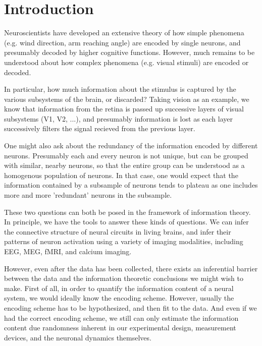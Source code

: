 \documentclass[12pt]{article}
\begin{document}
\maketitle

\newcommand{\tr}{\text{tr}}
\newcommand{\E}{\textbf{E}}
\newcommand{\diag}{\text{diag}}
\newcommand{\argmax}{\text{argmax}}
\newcommand{\Cov}{\text{Cov}}
\newcommand{\argmin}{\text{argmin}}
\newcommand{\Vol}{\text{Vol}}
\newcommand{\comm}[1]{}

\section{Introduction}

Neuroscientists have developed an extensive theory of how simple
phenomena (e.g. wind direction, arm reaching angle) are encoded by
single neurons, and presumably decoded by higher cognitive functions.
However, much remains to be understood about how complex phenomena
(e.g. visual stimuli) are encoded or decoded.

In particular, how much information about the stimulus is captured by
the various subsystems of the brain, or discarded?  Taking vision as
an example, we know that information from the retina is passed up
successive layers of visual subsystems (V1, V2, ...), and presumably
information is lost as each layer successively filters the signal
recieved from the previous layer.

One might also ask about the redundancy of the information encoded by
different neurons.  Presumably each and every neuron is not unique,
but can be grouped with similar, nearby neurons, so that the entire
group can be understood as a homogenous population of neurons.  In
that case, one would expect that the information contained by a
subsample of neurons tends to plateau as one includes more and more
'redundant' neurons in the subsample.

These two questions can both be posed in the framework of information
theory.  In principle, we have the tools to answer these kinds of
questions.  We can infer the connective structure of neural circuits
in living brains, and infer their patterns of neuron activation using
a variety of imaging modalities, including EEG, MEG, fMRI, and calcium
imaging.

However, even after the data has been collected, there exists an
inferential barrier between the data and the information theoretic
conclusions we might wish to make.  First of all, in order to quantify
the information content of a neural system, we would ideally know the
encoding scheme.  However, usually the encoding scheme has to be
hypothesized, and then fit to the data.  And even if we had the
correct encoding scheme, we still can only estimate the information
content due randomness inherent in our experimental design,
measurement devices, and the neuronal dynamics themselves.
\end{document}
